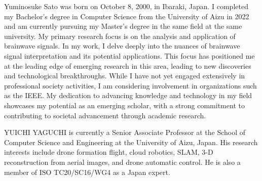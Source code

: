 \documentclass{ieeeaccess}
\begin{document}
    \begin{IEEEbiography}
        {Yuminosuke Sato}
        was born on October 8, 2000,
        in Ibaraki, Japan. I completed my Bachelor's degree
        in Computer Science from the University of Aizu in
        2022 and am currently pursuing my Master's degree
        in the same field at the same university. My primary
        research focus is on the analysis and application of
        brainwave signals. In my work, I delve deeply into
        the nuances of brainwave signal interpretation and
        its potential applications. This focus has positioned
        me at the leading edge of emerging research in this
        area, leading to new discoveries and technological breakthroughs. While I
        have not yet engaged extensively in professional society activities, I am
        considering involvement in organizations such as the IEEE. My dedication
        to advancing knowledge and technology in my field showcases my potential
        as an emerging scholar, with a strong commitment to contributing to societal
        advancement through academic research.
    \end{IEEEbiography}
    \begin{IEEEbiography}
        {YUICHI YAGUCHI}
        is currently a Senior Associate Professor at the School of Computer Science and Engineering at the University of Aizu, Japan. His research interests include drone formation flight, cloud robotics, SLAM, 3-D reconstruction from aerial images, and drone automatic control. He is also a member of ISO TC20/SC16/WG4 as a Japan expert.
    \end{IEEEbiography}

    \EOD
\end{document}
